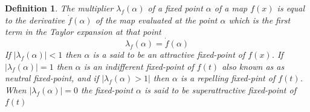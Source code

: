 \documentclass{article}
\newtheorem{definition}{Definition}
\begin{document}
\begin{definition}
  The multiplier $\lambda_f (\alpha)$ of a fixed point $\alpha$ of a map $f
  (x)$ is equal to the derivative $\dot{f} (\alpha)$ of the map evaluated at
  the point $\alpha$ which is the first term in the Taylor expansion at that
  point
  \begin{equation}
    \lambda_f (\alpha) = \dot{f} (\alpha)
  \end{equation}
  If $| \lambda_f (\alpha) | < 1$ then $\alpha$ is a said to be an attractive
  fixed-point of $f (x)$. If $| \lambda_f (\alpha) | = 1$ then $\alpha$ is an
  indifferent fixed-point of $f (t)$ also known as as neutral fixed-point, and
  if $| \lambda_f (\alpha) > 1 |$ then $\alpha$ is a repelling fixed-pint of
  $f (t)$. When $| \lambda_f (\alpha) | = 0$ the fixed-point $\alpha$ is said
  to be superattractive fixed-point of $f
  (t)${\cite[3.]{raadstrom1953iteration}}
\end{definition}
\end{document}
